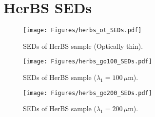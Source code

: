 \chapter{HerBS SEDs}

\begin{figure}
	\centering
	\caption[SEDs of HerBS sample (Optically thin)]{SEDs of HerBS sample (Optically thin).}
	\texttt{[image: Figures/herbs\_ot\_SEDs.pdf]}
\end{figure}

\begin{figure}
	\centering
	\caption[SEDs of HerBS sample ($\lambda_1 = 100\,\mu$m)]{SEDs of HerBS sample ($\lambda_1 = 100\,\mu$m).}
	\texttt{[image: Figures/herbs\_go100\_SEDs.pdf]}
\end{figure}

\begin{figure}
	\centering
	\caption[SEDs of HerBS sample ($\lambda_1 = 200\,\mu$m)]{SEDs of HerBS sample ($\lambda_1 = 200\,\mu$m).}
	\texttt{[image: Figures/herbs\_go200\_SEDs.pdf]}
\end{figure}